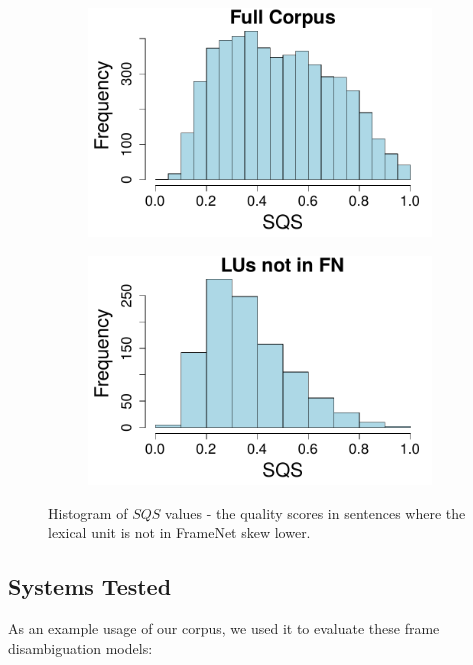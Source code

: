 \begin{figure}[htb!]
\begin{subfigure}{.5\textwidth}
\centering
\includegraphics[width=\linewidth]{img/sqs_full.pdf}
\end{subfigure}%
\begin{subfigure}{.5\textwidth}
\includegraphics[width=\linewidth]{img/sqs_notfn.pdf}
\end{subfigure}
\caption{Histogram of $SQS$ values - the quality scores in sentences where the lexical unit is not in FrameNet skew lower.}
\label{fig:sqs_histo}
\end{figure}

\subsection{Systems Tested}

As an example usage of our corpus, we used it to evaluate these frame disambiguation models:

